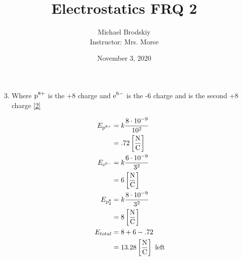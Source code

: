 \documentclass[12pt]{article}
\title{Electrostatics FRQ 2}
\date{November 3, 2020}
\author{Michael Brodskiy\\ \small Instructor: Mrs. Morse}
\begin{document}
\maketitle

\begin{enumerate}

    \setcounter{enumi}{2}

  \item Where $\ce{p^8+}$ is the +8 charge and $\ce{e^6-}$ is the -6 charge and  is the second +8 charge \eqref{2}

    \begin{equation}
      \begin{split}
        E_{\ce{p^8+}}&=k\frac{8\cdot10^{-9}}{10^2}\\
      &=.72\left[ \frac{\si{\newton}}{\si{\coulomb}} \right]\\
        E_{\ce{e^6-}}&=k\frac{6\cdot10^{-9}}{3^2}\\
        &=6\left[ \frac{\si{\newton}}{\si{\coulomb}} \right]\\
        E_{\ce{p^8_2}}&=k\frac{8\cdot10^{-9}}{3^2}\\
        &=8\left[ \frac{\si{\newton}}{\si{\coulomb}} \right]\\
        E_{total}&=8+6-.72\\
        &=13.28\left[ \frac{\si{\newton}}{\si{\coulomb}} \right]\text{ left}
    \end{split}
      \label{2}
    \end{equation}

\end{enumerate}
\end{document}
